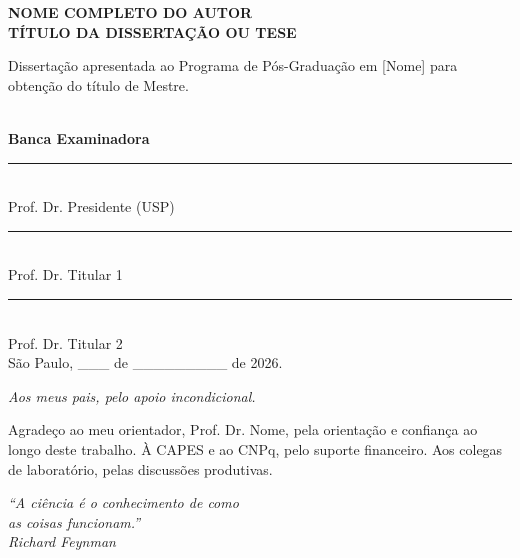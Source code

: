 \documentclass[
    12pt,                   %
    a4paper,                %
    openright,              %
    oneside,                %
    english,                %
    brazil                  %
]{abntex2}
\theoremstyle{plain}
\theoremstyle{definition}
\theoremstyle{remark}
\begin{document}
\begin{folhadeaprovacao}
    \center
    \textbf{NOME COMPLETO DO AUTOR}\\[2cm]
    \textbf{T\'ITULO DA DISSERTA\c{C}\~AO OU TESE}\\[2cm]
    \hspace*{\fill}\begin{minipage}{8cm}
    \small Disserta\c{c}\~ao apresentada ao Programa de
    P\'os-Gradua\c{c}\~ao em [Nome] para obten\c{c}\~ao do
    t\'itulo de Mestre.
    \end{minipage}\\[2cm]
    \vfill
    \textbf{Banca Examinadora}\\[1cm]
    \rule{8cm}{0.5pt} \\ Prof. Dr. Presidente (USP) \\
    \rule{8cm}{0.5pt} \\ Prof. Dr. Titular 1 \\
    \rule{8cm}{0.5pt} \\ Prof. Dr. Titular 2 \\
    \vfill
    S\~ao Paulo, \_\_\_ de \_\_\_\_\_\_\_\_\_ de 2026.
\end{folhadeaprovacao}

\begin{dedicatoria}
    \vspace*{\fill}
    \centering
    \noindent
    \textit{Aos meus pais, pelo apoio incondicional.}
    \vspace*{\fill}
\end{dedicatoria}

\begin{agradecimentos}
    Agrade\c{c}o ao meu orientador, Prof. Dr. Nome, pela
    orienta\c{c}\~ao e confian\c{c}a ao longo deste trabalho.
    \`A CAPES e ao CNPq, pelo suporte financeiro.
    Aos colegas de laborat\'orio, pelas discuss\~oes produtivas.
\end{agradecimentos}

\begin{epigrafe}
    \vspace*{\fill}
    \begin{flushright}
        \textit{``A ci\^encia \'e o conhecimento de como\\
        as coisas funcionam.''\\
        Richard Feynman}
    \end{flushright}
    \vspace*{\fill}
\end{epigrafe}
\end{document}
